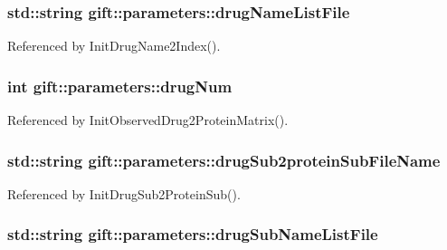 \subsubsection[{\texorpdfstring{drug\+Name\+List\+File}{drugNameListFile}}]{\setlength{\rightskip}{0pt plus 5cm}std\+::string gift\+::parameters\+::drug\+Name\+List\+File}\hypertarget{classgift_1_1parameters_ad7f26adc041d62b07fa99385565f51a1}{}\label{classgift_1_1parameters_ad7f26adc041d62b07fa99385565f51a1}


Referenced by Init\+Drug\+Name2\+Index().

\subsubsection[{\texorpdfstring{drug\+Num}{drugNum}}]{\setlength{\rightskip}{0pt plus 5cm}int gift\+::parameters\+::drug\+Num}\hypertarget{classgift_1_1parameters_a207a63e1ef9ef9b9d802c452029e27fa}{}\label{classgift_1_1parameters_a207a63e1ef9ef9b9d802c452029e27fa}


Referenced by Init\+Observed\+Drug2\+Protein\+Matrix().

\subsubsection[{\texorpdfstring{drug\+Sub2protein\+Sub\+File\+Name}{drugSub2proteinSubFileName}}]{\setlength{\rightskip}{0pt plus 5cm}std\+::string gift\+::parameters\+::drug\+Sub2protein\+Sub\+File\+Name}\hypertarget{classgift_1_1parameters_a9a245f231438683010d85aa618bd6bd4}{}\label{classgift_1_1parameters_a9a245f231438683010d85aa618bd6bd4}


Referenced by Init\+Drug\+Sub2\+Protein\+Sub().

\subsubsection[{\texorpdfstring{drug\+Sub\+Name\+List\+File}{drugSubNameListFile}}]{\setlength{\rightskip}{0pt plus 5cm}std\+::string gift\+::parameters\+::drug\+Sub\+Name\+List\+File}\hypertarget{classgift_1_1parameters_a9bc090c30495e569533f32198d5d92ae}{}\label{classgift_1_1parameters_a9bc090c30495e569533f32198d5d92ae}


